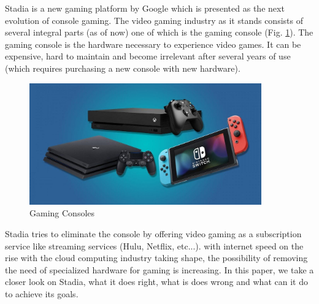 Stadia is a new gaming platform by Google which is presented as the next evolution
of console gaming. The video gaming industry as it stands consists of several 
integral parts (as of now) one of which is the gaming console (Fig. \ref{fig:consoles}). The gaming 
console is the hardware necessary to experience video games. It can be expensive, 
hard to maintain and become irrelevant after several years of use (which requires 
purchasing a new console with new hardware).

\begin{figure}[H]
    \centering
    \includegraphics[width=10cm]{images/consoles.jpg}
    \caption{Gaming Consoles}
    \label{fig:consoles}
\end{figure}

Stadia tries to eliminate the console by offering video gaming as a subscription 
service like streaming services (Hulu, Netflix, etc...). with internet speed on the rise 
with the cloud computing industry taking shape, the possibility of removing the 
need of specialized hardware for gaming is increasing.
In this paper, we take a closer look on Stadia, what it does right, what is does wrong
and what can it do to achieve its goals.
